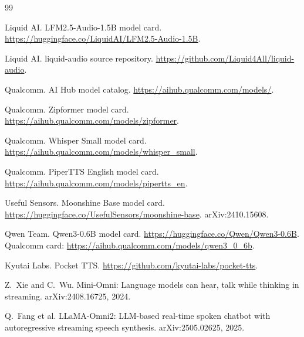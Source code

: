 \documentclass[10pt,twocolumn,letterpaper]{article}
\begin{document}

\begin{thebibliography}{99}
\footnotesize
\setlength{\itemsep}{0pt}
\setlength{\parskip}{0pt}

Liquid AI.
\newblock LFM2.5-Audio-1.5B model card.
\newblock \url{https://huggingface.co/LiquidAI/LFM2.5-Audio-1.5B}.

Liquid AI.
\newblock liquid-audio source repository.
\newblock \url{https://github.com/Liquid4All/liquid-audio}.

Qualcomm.
\newblock AI Hub model catalog.
\newblock \url{https://aihub.qualcomm.com/models/}.

Qualcomm.
\newblock Zipformer model card.
\newblock \url{https://aihub.qualcomm.com/models/zipformer}.

Qualcomm.
\newblock Whisper Small model card.
\newblock \url{https://aihub.qualcomm.com/models/whisper_small}.

Qualcomm.
\newblock PiperTTS English model card.
\newblock \url{https://aihub.qualcomm.com/models/pipertts_en}.

Useful Sensors.
\newblock Moonshine Base model card.
\newblock \url{https://huggingface.co/UsefulSensors/moonshine-base}.
\newblock arXiv:2410.15608.

Qwen Team.
\newblock Qwen3-0.6B model card.
\newblock \url{https://huggingface.co/Qwen/Qwen3-0.6B}.
\newblock Qualcomm card: \url{https://aihub.qualcomm.com/models/qwen3_0_6b}.

Kyutai Labs.
\newblock Pocket TTS.
\newblock \url{https://github.com/kyutai-labs/pocket-tts}.

Z.~Xie and C.~Wu.
\newblock Mini-Omni: Language models can hear, talk while thinking in streaming.
\newblock arXiv:2408.16725, 2024.

Q.~Fang et al.
\newblock LLaMA-Omni2: LLM-based real-time spoken chatbot with autoregressive
streaming speech synthesis.
\newblock arXiv:2505.02625, 2025.

\end{thebibliography}

\appendix
\end{document}
